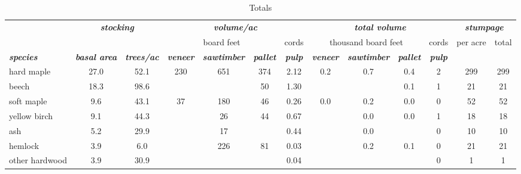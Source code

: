 \documentclass[landscape]{article}
\begin{document}
\begin{table}[H]

\caption{\label{tab:unnamed-chunk-51}Totals}
\fontsize{10}{12}\selectfont
\begin{tabular}[t]{lcccccccccccc}
\toprule
\multicolumn{1}{c}{\em{\textbf{ }}} & \multicolumn{2}{c}{\em{\textbf{stocking}}} & \multicolumn{4}{c}{\em{\textbf{volume/ac }}} & \multicolumn{4}{c}{\em{\textbf{total volume}}} & \multicolumn{2}{c}{\em{\textbf{stumpage}}} \\
\cmidrule(l{3pt}r{3pt}){2-3} \cmidrule(l{3pt}r{3pt}){4-7} \cmidrule(l{3pt}r{3pt}){8-11} \cmidrule(l{3pt}r{3pt}){12-13}
\multicolumn{3}{c}{ } & \multicolumn{3}{c}{board feet} & \multicolumn{1}{c}{cords} & \multicolumn{3}{c}{thousand board feet} & \multicolumn{1}{c}{cords} & \multicolumn{1}{c}{per acre} & \multicolumn{1}{c}{total} \\
\cmidrule(l{3pt}r{3pt}){4-6} \cmidrule(l{3pt}r{3pt}){7-7} \cmidrule(l{3pt}r{3pt}){8-10} \cmidrule(l{3pt}r{3pt}){11-11} \cmidrule(l{3pt}r{3pt}){12-12} \cmidrule(l{3pt}r{3pt}){13-13}
\rowcolor[HTML]{DCDCDC}  \em{\textbf{species}} & \em{\textbf{basal area}} & \em{\textbf{trees/ac}} & \em{\textbf{veneer}} & \em{\textbf{sawtimber}} & \em{\textbf{pallet}} & \em{\textbf{pulp}} & \em{\textbf{veneer}} & \em{\textbf{sawtimber}} & \em{\textbf{pallet}} & \em{\textbf{pulp}} & \em{\textbf{ }} & \em{\textbf{ }}\\
\midrule
\rowcolor{gray!6}  hard maple & 27.0 & 52.1 & 230 & 651 & 374 & 2.12 & 0.2 & 0.7 & 0.4 & 2 & 299 & 299\\
 
beech & 18.3 & 98.6 &  &  & 50 & 1.30 &  &  & 0.1 & 1 & 21 & 21\\
 
\rowcolor{gray!6}  soft maple & 9.6 & 43.1 & 37 & 180 & 46 & 0.26 & 0.0 & 0.2 & 0.0 & 0 & 52 & 52\\
 
yellow birch & 9.1 & 44.3 &  & 26 & 44 & 0.67 &  & 0.0 & 0.0 & 1 & 18 & 18\\
 
\rowcolor{gray!6}  ash & 5.2 & 29.9 &  & 17 &  & 0.44 &  & 0.0 &  & 0 & 10 & 10\\
 
hemlock & 3.9 & 6.0 &  & 226 & 81 & 0.03 &  & 0.2 & 0.1 & 0 & 21 & 21\\
 
\rowcolor{gray!6}  other hardwood & 3.9 & 30.9 &  &  &  & 0.04 &  &  &  & 0 & 1 & 1\\
 

\end{tabular}
\end{table}
\end{document}
